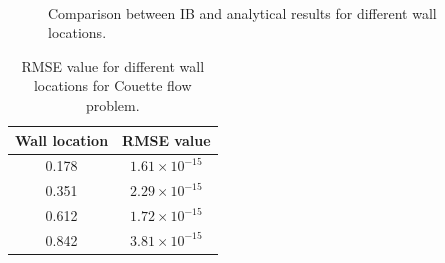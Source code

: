 \begin{figure}[H]
    \centering
    \quad
    \\
    \quad
    \caption{Comparison between IB and analytical results for different wall locations.}
    \label{fig:C3_indirectForcing_wallLocation}
\end{figure}
%
%
\begin{table}[H]
\centering
\begin{tabular}{c | c}
     Wall location & RMSE value \\ \hline \hline
     0.178 & $1.61 \times 10^{-15}$ \\ \hline
     0.351 & $2.29 \times 10^{-15}$ \\ \hline
     0.612 & $1.72 \times 10^{-15}$ \\ \hline
     0.842 & $3.81 \times 10^{-15}$
\end{tabular}
\caption{RMSE value for different wall locations for Couette flow problem.}
\label{table:C3_indirectForcing_wallLocationRSME}
\end{table}

